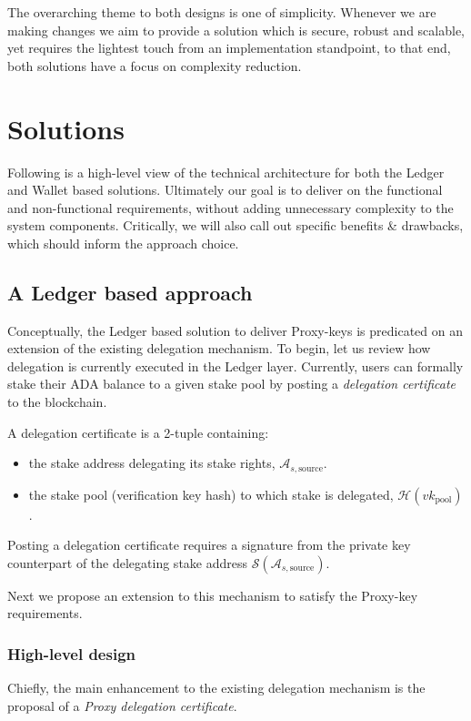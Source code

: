 \documentclass[11pt,a4paper]{article}
\begin{document}
The overarching theme to both designs is one of simplicity. Whenever we are making changes we 
aim to provide a solution which is secure, robust and scalable, yet requires the lightest touch from an
implementation standpoint, to that end, both solutions have a focus on complexity reduction.

\section{Solutions}
Following is a high-level view of the technical architecture for both the Ledger and Wallet based solutions.
Ultimately our goal is to deliver on the functional and non-functional requirements, without adding
unnecessary complexity to the system components. Critically, we will also call out specific benefits \&
drawbacks, which should inform the approach choice.

\subsection{A Ledger based approach}
Conceptually, the Ledger based solution to deliver Proxy-keys is predicated on an extension of the existing
delegation mechanism. To begin, let us review how delegation is currently executed in the Ledger layer. 
Currently, users can formally stake their ADA balance to a given stake pool by posting a \emph{delegation certificate} 
to the blockchain.

\begin{description}
  \item A delegation certificate is a 2-tuple containing:
  \begin{itemize}
    \item the stake address delegating its stake rights, $\mathcal{A}_{s,\text{source}}$.
    \item the stake pool (verification key hash) to which stake is delegated, $\mathcal{H}(vk_\text{pool})$.
  \end{itemize}
  Posting a delegation certificate requires a signature from the private key counterpart of the delegating 
  stake address $\mathcal{S}(\mathcal{A}_{s,\text{source}})$.
\end{description} 

Next we propose an extension to this mechanism to satisfy the Proxy-key requirements.

\pagebreak

\subsubsection{High-level design}
Chiefly, the main enhancement to the existing delegation mechanism is the proposal of a \emph{Proxy delegation certificate}.
\end{document}
